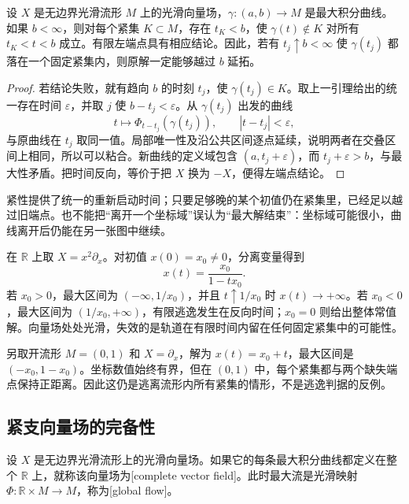 \begin{theorem}
	\label{g1:thm:flow-escape-criterion}
	设 \(X\) 是无边界光滑流形 \(M\) 上的光滑向量场，\(\gamma:(a,b)\to M\) 是最大积分曲线。如果 \(b<\infty\)，则对每个紧集 \(K\subset M\)，存在 \(t_K<b\)，使 \(\gamma(t)\notin K\) 对所有 \(t_K<t<b\) 成立。有限左端点具有相应结论。因此，若有 \(t_j\uparrow b<\infty\) 使 \(\gamma(t_j)\) 都落在一个固定紧集内，则原解一定能够越过 \(b\) 延拓。
\end{theorem}
\begin{proof}
	若结论失败，就有趋向 \(b\) 的时刻 \(t_j\)，使 \(\gamma(t_j)\in K\)。取上一引理给出的统一存在时间 \(\varepsilon\)，并取 \(j\) 使 \(b-t_j<\varepsilon\)。从 \(\gamma(t_j)\) 出发的曲线
	\[
		t\longmapsto\Phi_{t-t_j}(\gamma(t_j)),\qquad |t-t_j|<\varepsilon,
	\]
	与原曲线在 \(t_j\) 取同一值。局部唯一性及沿公共区间逐点延续，说明两者在交叠区间上相同，所以可以粘合。新曲线的定义域包含 \((a,t_j+\varepsilon)\)，而 \(t_j+\varepsilon>b\)，与最大性矛盾。把时间反向，等价于把 \(X\) 换为 \(-X\)，便得左端点结论。
\end{proof}

紧性提供了统一的重新启动时间；只要足够晚的某个初值仍在紧集里，已经足以越过旧端点。也不能把“离开一个坐标域”误认为“最大解结束”：坐标域可能很小，曲线离开后仍能在另一张图中继续。

\begin{example}
	\label{g1:exm:finite-time-flow-escape}
	在 \(\mathbb R\) 上取 \(X=x^2\partial_x\)。对初值 \(x(0)=x_0\neq0\)，分离变量得到
	\[
		x(t)=\frac{x_0}{1-tx_0}.
	\]
	若 \(x_0>0\)，最大区间为 \((-\infty,1/x_0)\)，并且 \(t\uparrow1/x_0\) 时 \(x(t)\to+\infty\)。若 \(x_0<0\)，最大区间为 \((1/x_0,+\infty)\)，有限逃逸发生在反向时间；\(x_0=0\) 则给出整体常值解。向量场处处光滑，失效的是轨道在有限时间内留在任何固定紧集中的可能性。

	另取开流形 \(M=(0,1)\) 和 \(X=\partial_x\)，解为 \(x(t)=x_0+t\)，最大区间是 \((-x_0,1-x_0)\)。坐标数值始终有界，但在 \((0,1)\) 中，每个紧集都与两个缺失端点保持正距离。因此这仍是逃离流形内所有紧集的情形，不是逃逸判据的反例。
\end{example}

\subsection{紧支向量场的完备性}
\label{g1:subsec:1302:02}

\begin{definition}
	\label{g1:def:complete-vector-field}
	设 \(X\) 是无边界光滑流形上的光滑向量场。如果它的每条最大积分曲线都定义在整个 \(\mathbb R\) 上，就称该向量场为[complete vector field]。此时最大流是光滑映射 \(\Phi:\mathbb R\times M\to M\)，称为[global flow]。
\end{definition}

